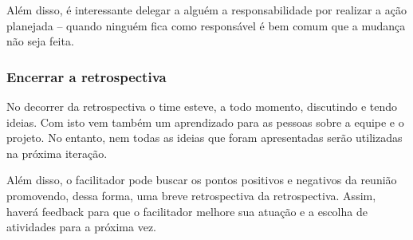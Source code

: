 Além disso, é interessante delegar a alguém a responsabilidade por realizar a ação planejada -- quando ninguém fica como responsável é bem comum que a mudança não seja feita.


\subsubsection*{Encerrar a retrospectiva}

No decorrer da retrospectiva o time esteve, a todo momento, discutindo e tendo ideias. Com isto vem também um aprendizado para as pessoas sobre a equipe e o projeto. No entanto, nem todas as ideias que foram apresentadas serão utilizadas na próxima iteração.

Além disso, o facilitador pode  buscar os pontos positivos e negativos da reunião promovendo, dessa forma, uma breve retrospectiva da retrospectiva. Assim, haverá feedback para que o facilitador melhore sua atuação e a escolha de atividades para a próxima vez.